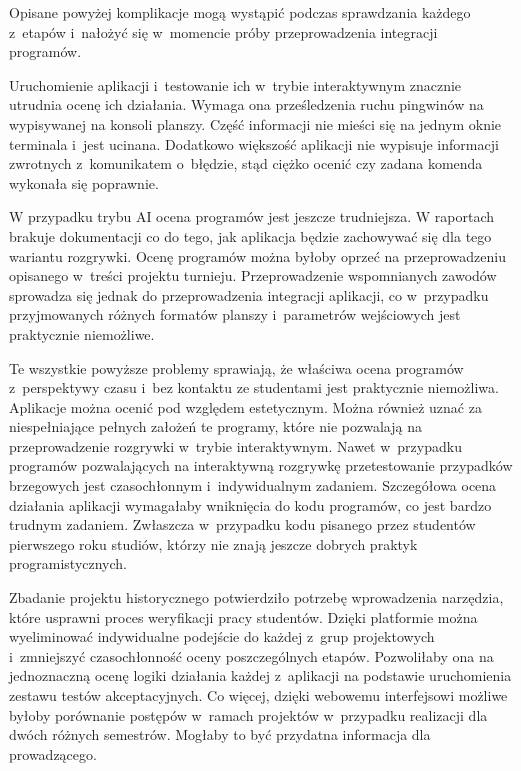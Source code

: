 Opisane powyżej komplikacje mogą wystąpić podczas sprawdzania każdego z~etapów i~nałożyć się w~momencie próby przeprowadzenia integracji programów.

Uruchomienie aplikacji i~testowanie ich w~trybie interaktywnym znacznie utrudnia ocenę ich działania.
Wymaga ona prześledzenia ruchu pingwinów na wypisywanej na konsoli planszy.
Część informacji nie mieści się na jednym oknie terminala i~jest ucinana.
Dodatkowo większość aplikacji nie wypisuje informacji zwrotnych z~komunikatem o~błędzie, stąd ciężko ocenić czy zadana komenda wykonała się poprawnie.

W przypadku trybu AI ocena programów jest jeszcze trudniejsza.
W raportach brakuje dokumentacji co do tego, jak aplikacja będzie zachowywać się dla tego wariantu rozgrywki.
Ocenę programów można byłoby oprzeć na przeprowadzeniu opisanego w~treści projektu turnieju.
Przeprowadzenie wspomnianych zawodów sprowadza się jednak do przeprowadzenia integracji aplikacji, co w~przypadku przyjmowanych różnych formatów planszy i~parametrów wejściowych jest praktycznie niemożliwe.

Te wszystkie powyższe problemy sprawiają, że właściwa ocena programów z~perspektywy czasu i~bez kontaktu ze studentami jest praktycznie niemożliwa.
Aplikacje można ocenić pod względem estetycznym.
Można również uznać za niespełniające pełnych założeń te programy, które nie pozwalają na przeprowadzenie rozgrywki w~trybie interaktywnym.
Nawet w~przypadku programów pozwalających na interaktywną rozgrywkę przetestowanie przypadków brzegowych jest czasochłonnym i~indywidualnym zadaniem.
Szczegółowa ocena działania aplikacji wymagałaby wniknięcia do kodu programów, co jest bardzo trudnym zadaniem.
Zwłaszcza w~przypadku kodu pisanego przez studentów pierwszego roku studiów, którzy nie znają jeszcze dobrych praktyk programistycznych.

Zbadanie projektu historycznego potwierdziło potrzebę wprowadzenia narzędzia, które usprawni proces weryfikacji pracy studentów.
Dzięki platformie można wyeliminować indywidualne podejście do każdej z~grup projektowych i~zmniejszyć czasochłonność oceny poszczególnych etapów.
Pozwoliłaby ona na jednoznaczną ocenę logiki działania każdej z~aplikacji na podstawie uruchomienia zestawu testów akceptacyjnych.
Co więcej, dzięki webowemu interfejsowi możliwe byłoby porównanie postępów w~ramach projektów w~przypadku realizacji dla dwóch różnych semestrów.
Mogłaby to być przydatna informacja dla prowadzącego.

